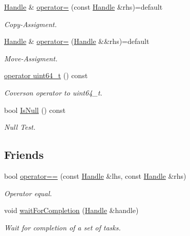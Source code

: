 \begin{DoxyCompactItemize}
\hyperlink{classshad_1_1rt_1_1Handle}{Handle} \& \hyperlink{classshad_1_1rt_1_1Handle_ab46fda0b90ed3cfe85adc0b10246498d}{operator=} (const \hyperlink{classshad_1_1rt_1_1Handle}{Handle} \&rhs)=default
\begin{DoxyCompactList}\small\item\em Copy-\/\-Assigment. \end{DoxyCompactList}\item 
\hyperlink{classshad_1_1rt_1_1Handle}{Handle} \& \hyperlink{classshad_1_1rt_1_1Handle_aa038b056582fc8a6c57c8a32edba0228}{operator=} (\hyperlink{classshad_1_1rt_1_1Handle}{Handle} \&\&rhs)=default
\begin{DoxyCompactList}\small\item\em Move-\/\-Assigment. \end{DoxyCompactList}\item 
\hyperlink{classshad_1_1rt_1_1Handle_a596bcb23af474805c175d5617b5af521}{operator uint64\-\_\-t} () const 
\begin{DoxyCompactList}\small\item\em Coverson operator to uint64\-\_\-t. \end{DoxyCompactList}\item 
bool \hyperlink{classshad_1_1rt_1_1Handle_ac24cb85580cac80052778560f71810b7}{Is\-Null} () const 
\begin{DoxyCompactList}\small\item\em Null Test. \end{DoxyCompactList}\end{DoxyCompactItemize}
\subsection*{Friends}
\begin{DoxyCompactItemize}
\item 
bool \hyperlink{classshad_1_1rt_1_1Handle_a8a1b1362bff49cc0f4a7a0792cf5f2bd}{operator==} (const \hyperlink{classshad_1_1rt_1_1Handle}{Handle} \&lhs, const \hyperlink{classshad_1_1rt_1_1Handle}{Handle} \&rhs)
\begin{DoxyCompactList}\small\item\em Operator equal. \end{DoxyCompactList}\item 
void \hyperlink{classshad_1_1rt_1_1Handle_a52609d341b4f03cc069a180d2ce4e741}{wait\-For\-Completion} (\hyperlink{classshad_1_1rt_1_1Handle}{Handle} \&handle)
\begin{DoxyCompactList}\small\item\em Wait for completion of a set of tasks. \end{DoxyCompactList}\end{DoxyCompactItemize}



